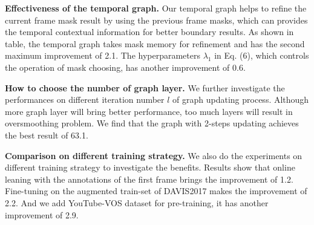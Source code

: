\documentclass[letterpaper]{article} \usepackage{aaai21}  \usepackage{times}  \usepackage{helvet} \usepackage{courier}  \usepackage[hyphens]{url}  \usepackage{graphicx} \urlstyle{rm} \def\UrlFont{\rm}  \usepackage{graphicx}  \usepackage{natbib}  \usepackage{caption} \frenchspacing  \setlength{\pdfpagewidth}{8.5in}  \setlength{\pdfpageheight}{11in}  \usepackage{amsmath}
\begin{document}
\noindent \textbf{Effectiveness of the temporal graph.}
Our temporal graph helps to refine the current frame mask result by using the previous frame masks, which can provides the temporal contextual information for better boundary results. As shown in table,
the temporal graph takes mask memory for refinement and has the second maximum improvement of 2.1.  The hyperparameters $\lambda_1$ in Eq. (6), which controls the operation of mask choosing, has another improvement of 0.6.

\noindent \textbf{How to choose the number of graph layer.}
We further investigate the performances on different iteration number $l$ of graph updating process. Although more graph layer will bring better performance, too much layers will result in oversmoothing problem. We find that the graph with 2-steps updating achieves the best result of 63.1.

\noindent \textbf{Comparison on different training strategy.}
We also do the experiments on different training strategy to investigate the benefits. Results show that online leaning with the annotations of the first frame brings the improvement of 1.2. Fine-tuning on the augmented train-set of DAVIS2017 makes the improvement of 2.2. And we add YouTube-VOS dataset for pre-training, it has another improvement of 2.9.
\end{document}
